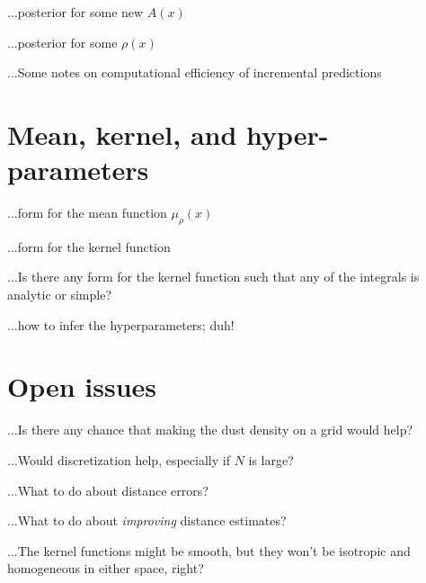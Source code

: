 \documentclass[12pt, letterpaper]{article}
\begin{document}
...posterior for some new $A(x)$

...posterior for some $\rho(x)$

...Some notes on computational efficiency of incremental predictions

\section{Mean, kernel, and hyper-parameters}

...form for the mean function $\mu_\rho(x)$

...form for the kernel function

...Is there any form for the kernel function such that any of the integrals is analytic or simple?

...how to infer the hyperparameters; duh!

\section{Open issues}

...Is there any chance that making the dust density on a grid would help?

...Would discretization help, especially if $N$ is large?

...What to do about distance errors?

...What to do about \emph{improving} distance estimates?

...The kernel functions might be smooth, but they won't be isotropic and homogeneous in either space, right?
\end{document}
